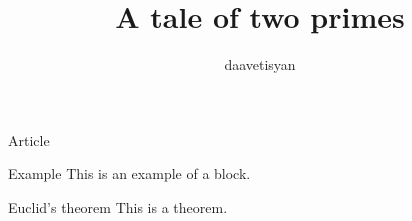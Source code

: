 \documentclass{beamer}
\author{daavetisyan}
\title{A tale of two primes}
\begin{document}
\begin{frame}{Article}
\begin{block}{Example}
This is an example of a block.
\end{block}
\begin{block}{Euclid's theorem}
This is a theorem.
\end{block}
\end{frame}
\end{document}
